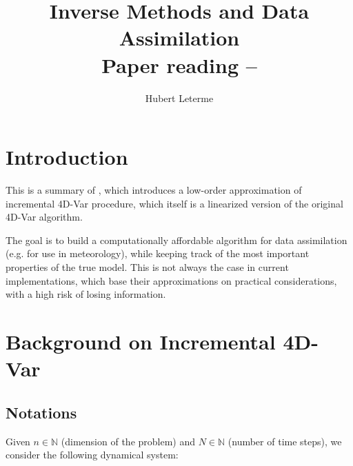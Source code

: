 \documentclass[a4paper,10pt]{article}
\title{Inverse Methods and Data Assimilation\\Paper reading -- \cite{lawless2008}}
\author{Hubert Leterme}
\newcommand{\mathN}{\mathbb{N}}
\begin{document}
\maketitle


\section{Introduction}

This is a summary of \cite{lawless2008}, which introduces a low-order approximation of incremental 4D-Var procedure, which itself is a linearized version of the original 4D-Var algorithm.

The goal is to build a computationally affordable algorithm for data assimilation (e.g. for use in meteorology), while keeping track of the most important properties of the true model. This is not always the case in current implementations, which base their approximations on practical considerations, with a high risk of losing information.

\section{Background on Incremental 4D-Var}

\subsection{Notations}

Given $n \in \mathN$ (dimension of the problem) and $N \in \mathN$ (number of time steps), we consider the following dynamical system:
\end{document}

